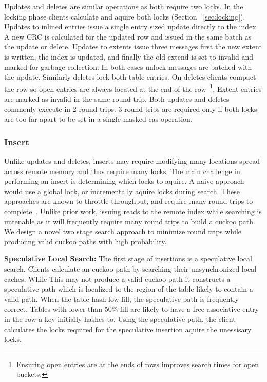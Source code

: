 Updates and deletes are similar operations as both require
two locks. In the locking phase clients calculate and aquire
both locks (Section ~\ref{sec:locking}). Updates to inlined
entries issue a single entry sized update directly to the
index. A new CRC is calculated for the updated row and
issued in the same batch as the update or delete.  Updates
to extents issue three messages first the new extent is
written, the index is updated, and finally the old extend is
set to invalid and marked for garbage collection. In both
cases unlock messages are batched with the update. Similarly
deletes lock both table entries. On deletes clients compact
the row so open entries are always located at the end of the
row~\footnote{Ensuring open entries are at the ends of rows
improves search times for open buckets.}. Extent entries are
marked as invalid in the same round trip. Both updates and
deletes commonly execute in 2 round trips. 3 round trips are
required only if both locks are too far apart to be set in a
single masked cas operation.

\subsubsection{Insert}
\label{sec:insert}

Unlike updates and deletes, inserts may require modifying
many locations spread across remote memory and thus require
many locks. The main challenge in performing an insert is
determining which locks to aquire. A naive approach would
use a global lock, or incrementally aquire locks during
search. These approaches are known to throttle throughput,
and require many round trips to
complete~\cite{cuckoo-improvements}. Unlike prior work,
issuing reads to the remote index while searching is
untenable as it will frequently require many round trips to
build a cuckoo path.  We design a novel two stage search
approach to minimize round trips while producing valid
cuckoo paths with high probability.

\textbf{Speculative Local Search:} The first stage of
insertions is a speculative local search. Clients calculate
an cuckoo path by searching their unsynchronized local
caches. While This may not produce a valid cuckoo path it
constructs a speculative path which is localized to the
region of the table likely to contain a valid path. When the
table hash low fill, the speculative path is frequently
correct. Tables with lower than 50\% fill are likely to have
a free associative entry in the row a key initially hashes
to.  Using the speculative path, the client calculates the
locks required for the speculative insertion aquire the
unessisary locks.

